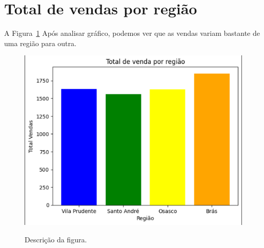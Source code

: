 \section{Total de vendas por região}
\label{sec:figura}
A Figura~\ref{figuras/Vendasregiao.png} Após analisar gráfico, podemos ver que as vendas variam bastante de uma região para outra.
\begin{figure}[!ht]
	{\centering
		\caption{Descrição da figura.}
		\includegraphics[width=1.0\textwidth]{figuras/Vendasregiao.png}
		\label{figuras/Vendasregiao.png}
	}
\end{figure} \\ \\ \\ \\ \\ \\

